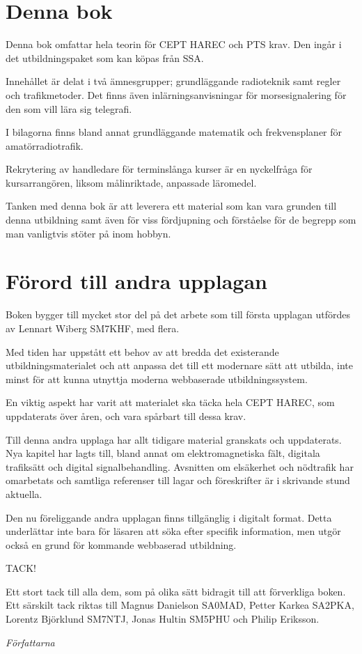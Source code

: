 \section*{Denna bok}

Denna bok omfattar hela teorin för CEPT HAREC och PTS krav.
Den ingår i det utbildningspaket som kan köpas från SSA.

Innehållet är delat i två ämnesgrupper; grundläggande radioteknik
samt regler och trafikmetoder.
Det finns även inlärningsanvisningar för morsesignalering för den
som vill lära sig telegrafi.

I bilagorna finns bland annat grundläggande matematik
och frekvensplaner för amatörradiotrafik.

Rekrytering av handledare för terminslånga kurser är en nyckelfråga för
kursarrangören, liksom målinriktade, anpassade läromedel.

Tanken med denna bok är att leverera ett material som kan vara grunden till
denna utbildning samt även för viss fördjupning och förståelse för de begrepp
som man vanligtvis stöter på inom hobbyn.



\clearpage

\section*{Förord till andra upplagan}

Boken bygger till mycket stor del på det arbete som till första upplagan
utfördes av Lennart Wiberg SM7KHF, med flera.

Med tiden har uppstått ett behov av att bredda det existerande
utbildningsmaterialet och att anpassa det till ett modernare sätt att utbilda,
inte minst för att kunna utnyttja moderna webbaserade utbildningssystem.

En viktig aspekt har varit att materialet ska täcka hela CEPT HAREC,
som uppdaterats över åren, och vara spårbart till dessa krav.

Till denna andra upplaga har allt tidigare material granskats och uppdaterats.
Nya kapitel har lagts till, bland annat om elektromagnetiska fält, digitala
trafiksätt och digital signalbehandling.
Avsnitten om elsäkerhet och nödtrafik har omarbetats och samtliga referenser
till lagar och föreskrifter är i skrivande stund aktuella.

Den nu föreliggande andra upplagan finns tillgänglig i digitalt format.
Detta underlättar inte bara för läsaren att söka efter specifik information,
men utgör också en grund för kommande webbaserad utbildning.



TACK!

Ett stort tack till alla dem, som på olika sätt bidragit till att förverkliga
boken.
Ett särskilt tack riktas till Magnus Danielson SA0MAD, Petter Karkea SA2PKA,
Lorentz Björklund SM7NTJ, Jonas Hultin SM5PHU och Philip Eriksson.

\emph{Författarna}
